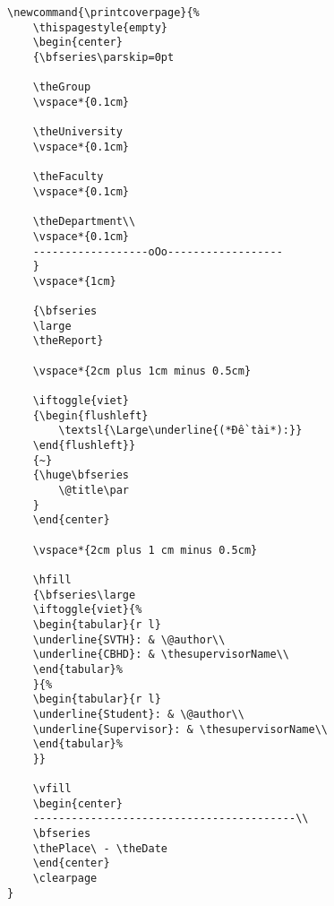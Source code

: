 \begin{lstlisting}[firstnumber=223]
\newcommand{\printcoverpage}{%
	\thispagestyle{empty}
	\begin{center}
	{\bfseries\parskip=0pt
	
	\theGroup
	\vspace*{0.1cm}
	
	\theUniversity
	\vspace*{0.1cm}
	
	\theFaculty
	\vspace*{0.1cm}
	
	\theDepartment\\
	\vspace*{0.1cm}
	------------------oOo------------------
	}
	\vspace*{1cm}
	
	{\bfseries
	\large
	\theReport}
	
	\vspace*{2cm plus 1cm minus 0.5cm}
	
	\iftoggle{viet}
	{\begin{flushleft}
		\textsl{\Large\underline{(*Đề tài*):}}
	\end{flushleft}}
	{~}
	{\huge\bfseries
		\@title\par	
	}
	\end{center}
	
	\vspace*{2cm plus 1 cm minus 0.5cm}
	
	\hfill
	{\bfseries\large
	\iftoggle{viet}{%
	\begin{tabular}{r l}
	\underline{SVTH}: & \@author\\
	\underline{CBHD}: & \thesupervisorName\\
	\end{tabular}%
	}{%
	\begin{tabular}{r l}
	\underline{Student}: & \@author\\
	\underline{Supervisor}: & \thesupervisorName\\
	\end{tabular}%
	}}
	
	\vfill
	\begin{center}
	-----------------------------------------\\
	\bfseries
	\thePlace\ - \theDate
	\end{center}
	\clearpage
}
\end{lstlisting}

